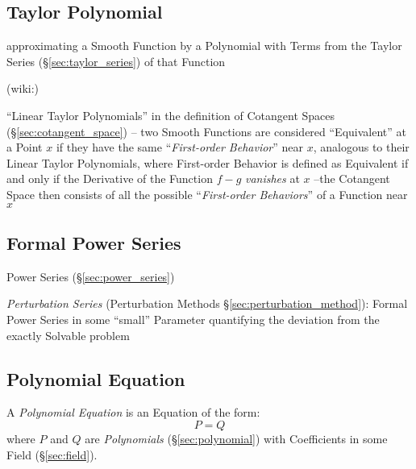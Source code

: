 \subsection{Taylor Polynomial}\label{sec:taylor_polynomial}

approximating a Smooth Function by a Polynomial with Terms from the
Taylor Series (\S\ref{sec:taylor_series}) of that Function

(wiki:)

``Linear Taylor Polynomials'' in the definition of Cotangent Spaces
(\S\ref{sec:cotangent_space}) -- two Smooth Functions are considered
``Equivalent'' at a Point $x$ if they have the same ``\emph{First-order
  Behavior}'' near $x$, analogous to their Linear Taylor Polynomials,
where First-order Behavior is defined as Equivalent if and only if the
Derivative of the Function $f-g$ \emph{vanishes} at $x$ --the Cotangent Space
then consists of all the possible ``\emph{First-order Behaviors}'' of a
Function near $x$



\subsection{Formal Power Series}\label{sec:formal_power_series}

\fist Power Series (\S\ref{sec:power_series})

\fist \emph{Perturbation Series} (Perturbation Methods
\S\ref{sec:perturbation_method}): Formal Power Series in some ``small''
Parameter quantifying the deviation from the exactly Solvable problem



\subsection{Polynomial Equation}\label{sec:polynomial_equation}

A \emph{Polynomial Equation} is an Equation of the form:
\[
  P = Q
\]
where $P$ and $Q$ are \emph{Polynomials} (\S\ref{sec:polynomial}) with
Coefficients in some Field (\S\ref{sec:field}).

